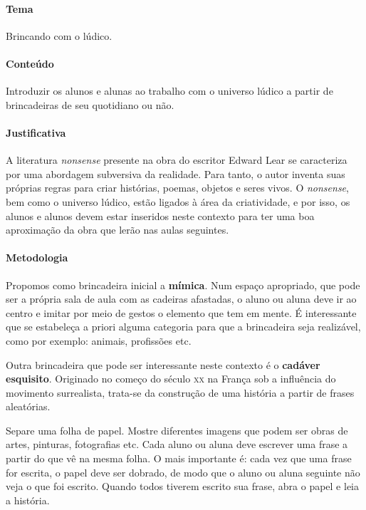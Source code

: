 \documentclass[11pt]{extarticle}
\begin{document}
\paragraph{Tema} Brincando com o lúdico.

\paragraph{Conteúdo} Introduzir os alunos e alunas ao trabalho com o 
universo lúdico a partir de brincadeiras de seu quotidiano ou não.

\paragraph{Justificativa} A literatura \emph{nonsense} presente na obra 
do escritor Edward Lear se caracteriza por uma abordagem subversiva da realidade. 
Para tanto, o autor inventa suas próprias regras para criar histórias,
poemas, objetos e seres vivos. O \emph{nonsense}, bem como o universo lúdico,
estão ligados à área da criatividade, e por isso, os alunos e alunos
devem estar inseridos neste contexto para ter uma boa aproximação da
obra que lerão nas aulas seguintes.  

\paragraph{Metodologia} Propomos como brincadeira inicial a \textbf{mímica}.
Num espaço apropriado, que pode ser a própria sala de aula com as cadeiras
afastadas, o aluno ou aluna deve ir ao centro e imitar por meio de gestos 
o elemento que tem em mente. É interessante que se estabeleça a 
priori alguma categoria  para que a brincadeira seja realizável, como
por exemplo: animais, profissões etc.

Outra brincadeira que pode ser interessante neste contexto 
é o \textbf{cadáver esquisito}. Originado no começo do século \textsc{xx} na França
sob a influência do movimento surrealista, trata-se da construção de uma história a partir
de frases aleatórias.

Separe uma folha de papel. Mostre diferentes imagens que podem ser
obras de artes, pinturas, fotografias etc. Cada aluno ou aluna
deve escrever uma frase a partir do que vê na mesma folha.
O mais importante é: cada vez que uma frase for escrita, o papel deve ser
dobrado, de modo que o aluno ou aluna seguinte não veja o que foi escrito.
Quando todos tiverem escrito sua frase, abra o papel e leia a história. 
\end{document}
